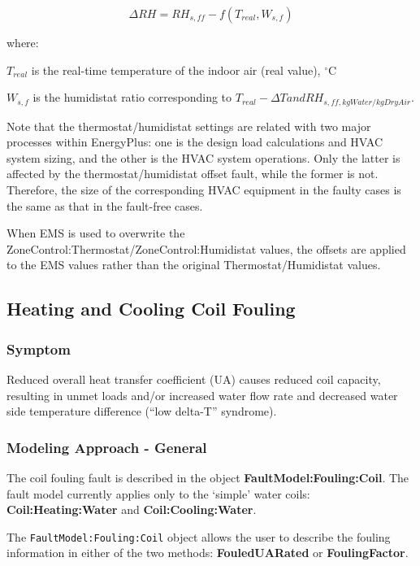\begin{equation}
\Delta RH = RH_{s,ff} - f(T_{real}, W_{s,f})
\end{equation}

where:

\(T_{real}\) is the real-time temperature of the indoor air (real value), \(^{\circ}\)C

\(W_{s,f}\) is the humidistat ratio corresponding to \(T_{real} - \Delta T and RH_{s,ff, kgWater/kgDryAir}\).

Note that the thermostat/humidistat settings are related with two major processes within EnergyPlus: one is the design load calculations and HVAC system sizing, and the other is the HVAC system operations. Only the latter is affected by the thermostat/humidistat offset fault, while the former is not. Therefore, the size of the corresponding HVAC equipment in the faulty cases is the same as that in the fault-free cases.

When EMS is used to overwrite the ZoneControl:Thermostat/ZoneControl:Humidistat values, the offsets are applied to the EMS values rather than the original Thermostat/Humidistat values.

\subsection{Heating and Cooling Coil Fouling}\label{heating-and-cooling-coil-fouling}

\subsubsection{Symptom}\label{symptom-2}

Reduced overall heat transfer coefficient (UA) causes reduced coil capacity, resulting in unmet loads and/or increased water flow rate and decreased water side temperature difference (``low delta-T'' syndrome).

\subsubsection{Modeling Approach - General}\label{modeling-approach-2}

The coil fouling fault is described in the object \textbf{FaultModel:Fouling:Coil}. The fault model currently applies only to the `simple' water coils:
\textbf{Coil:Heating:Water} and \textbf{Coil:Cooling:Water}.

The \lstinline!FaultModel:Fouling:Coil! object allows the user to describe the fouling information in either of the two methods: \textbf{FouledUARated} or \textbf{FoulingFactor}.

